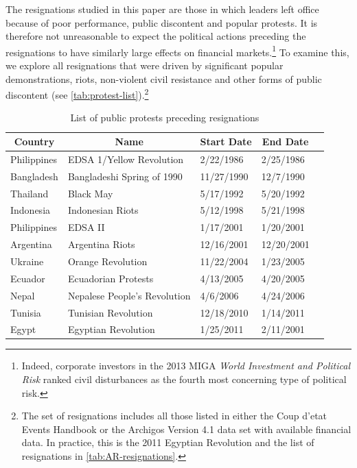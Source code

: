 \documentclass[12pt,final,fleqn]{article}
\theoremstyle{plain}
\begin{document}
The resignations studied in this paper are those in which leaders left office because of poor performance, public discontent and popular protests. It is therefore not unreasonable to expect the political actions preceding the resignations to have similarly large effects on financial markets.\footnote{Indeed, corporate investors in the 2013 MIGA \textit{World Investment and Political Risk} ranked civil disturbances as the fourth most concerning type of political risk.} To examine this, we explore all resignations that were driven by significant popular demonstrations, riots, non-violent civil resistance and other forms of public discontent (see \autoref{tab:protest-list}).\footnote{The set of resignations includes all those listed in either the Coup d'etat Events Handbook or the Archigos Version 4.1 data set with available financial data. In practice, this is the 2011 Egyptian Revolution and the list of resignations in \autoref{tab:AR-resignations}.}

\begin{table}[!ht]
\caption{List of public protests preceding resignations} \label{tab:protest-list}
\vspace{-5pt}
\footnotesize
\begin{center}
\begin{threeparttable}
\begin{tabular*}{\textwidth}{l@{\extracolsep{\fill}}llll}
  \hline
    \hline
\multicolumn{1}{c}{Country}&\multicolumn{1}{c}{Name}&\multicolumn{1}{c}{Start Date}&\multicolumn{1}{c}{End Date}\\
  \hline
Philippines & EDSA 1/Yellow Revolution & 2/22/1986 & 2/25/1986\\
Bangladesh & Bangladeshi Spring of 1990 & 11/27/1990 & 12/7/1990\\
Thailand & Black May & 5/17/1992 & 5/20/1992\\
Indonesia & Indonesian Riots & 5/12/1998 & 5/21/1998\\
Philippines & EDSA II & 1/17/2001 & 1/20/2001\\
Argentina & Argentina Riots & 12/16/2001 & 12/20/2001\\
Ukraine & Orange Revolution & 11/22/2004 & 1/23/2005\\
Ecuador & Ecuadorian Protests & 4/13/2005 & 4/20/2005\\
Nepal & Nepalese People's Revolution & 4/6/2006 & 4/24/2006\\
Tunisia & Tunisian Revolution & 12/18/2010 & 1/14/2011\\
Egypt & Egyptian Revolution & 1/25/2011 & 2/11/2001\\
   \hline
   \hline
\end{tabular*}
\scriptsize
\end{threeparttable}
\end{center}
\end{table}
\end{document}
